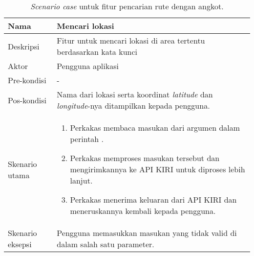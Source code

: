 \begin{table}[H]
    \centering
    \begin{tabular}{|p{3cm}|p{10cm}|}
    \hline
        Nama & Mencari lokasi\\
    \hline
    \hline
        Deskripsi & Fitur untuk mencari lokasi di area tertentu berdasarkan kata kunci\\
    \hline
		Aktor & Pengguna aplikasi\\
	\hline
		Pre-kondisi & -\\
    \hline
		Pos-kondisi & Nama dari lokasi serta koordinat \textit{latitude} dan \textit{longitude}-nya ditampilkan kepada pengguna.\\
    \hline
		Skenario utama & 
		\begin{enumerate}
			\item Perkakas membaca masukan dari argumen dalam perintah \cl.
			\item Perkakas memproses masukan tersebut dan mengirimkannya ke API KIRI untuk diproses lebih lanjut.
			\item Perkakas menerima keluaran dari API KIRI dan  meneruskannya kembali kepada pengguna.
        \end{enumerate}\\
    \hline
		Skenario eksepsi & Pengguna memasukkan masukan yang tidak valid di dalam salah satu parameter.\\
	\hline
    \end{tabular}
    \caption{\textit{Scenario case} untuk fitur pencarian rute dengan angkot.}
    \label{tab:thesisapp-scenariocase-searchplace}
\end{table}

